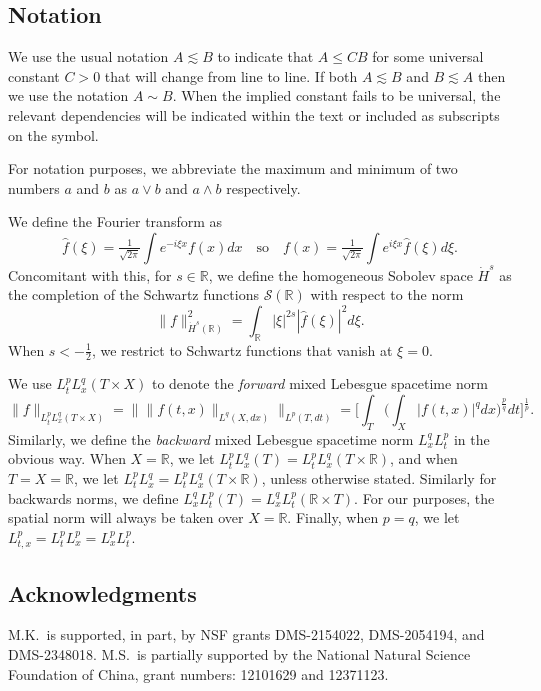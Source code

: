 \documentclass[10pt, reqno]{amsart}
\numberwithin{equation}{section}
\newcommand{\R}{\mathbb{R}}
\theoremstyle{definition}
\theoremstyle{remark}
\begin{document}
    \subsection*{Notation}
We use the usual notation $A \lesssim B$ to indicate that $A \leq C B$ for some universal constant $C > 0$ that will change from line to line. If both $A \lesssim B$ and $B \lesssim A$ then we use the notation $A \sim B$. When the implied constant fails to be universal, the relevant dependencies will be indicated within the text or included as subscripts on the symbol. 

For notation purposes, we abbreviate the maximum and minimum of two numbers $a$ and $b$ as $a \vee b$ and $a \wedge b$ respectively.

We define the Fourier transform as
\begin{equation*}
\widehat{f}(\xi) = \tfrac{1}{\sqrt{2\pi}}\int e^{-i \xi x} f(x) dx \quad \text{so} \quad f(x) = \tfrac{1}{\sqrt{2\pi}} \int e^{i \xi x} \widehat{f}(\xi) d\xi.
\end{equation*}
Concomitant with this, for $s \in \R$, we define the homogeneous Sobolev space $\dot{H}^s$ as the completion of the Schwartz functions $\mathcal{S}(\R)$ with respect to the norm
\begin{equation*}
    \|f\|^2_{\dot{H}^s(\R)} = \int_\R |\xi|^{2s} |\widehat{f}(\xi)|^2 d\xi.
\end{equation*}
When $s < -\frac{1}{2}$, we restrict to Schwartz functions that vanish at $\xi = 0$. 

We use $L_t^p L_x^q(T \times X)$ to denote the {\em forward} mixed Lebesgue spacetime norm
\begin{equation*}
    \|f\|_{L_t^p L_x^q(T\times X)} = \big\| \|f(t,x)\|_{L^q(X,dx)} \big\|_{L^p(T,dt)} = \bigg[ \int_T \bigg(\int_X |f(t,x)|^q dx\bigg)^{\frac{p}{q}} dt\bigg]^{\frac{1}{p}}.
\end{equation*}
Similarly, we define the {\em backward} mixed Lebesgue spacetime norm $L_x^q L_t^p$ in the obvious way. When $X = \R$, we let $L_t^pL_x^q(T) = L_t^pL_x^q(T \times \R)$,
and when $T = X = \R$, we let $L_t^pL_x^q = L_t^pL_x^q(T \times \R)$, unless otherwise stated. Similarly for backwards norms, we define $L_x^qL_t^p(T) = L_x^qL_t^p(\R \times T)$. For our purposes, the spatial norm will always be taken over $X = \R$. Finally, when $p = q$, we let $L^p_{t,x} = L_t^p L_x^p = L^p_x L^p_t$.  


\subsection*{Acknowledgments}
M.K.~is supported, in part, by NSF grants DMS-2154022, DMS-2054194, and DMS-2348018. M.S.~is partially supported by the National Natural Science Foundation of China, grant numbers: 12101629 and 12371123.
\end{document}
